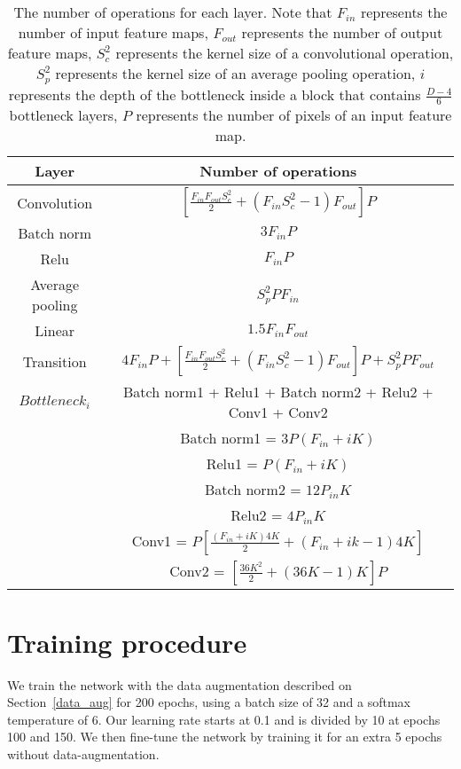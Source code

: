 \documentclass{article}
\begin{document}
\begin{table}[h]
    \centering
    \begin{tabular}{c|c}
    Layer     & Number of operations  \\
    \hline
    Convolution     &  $[\frac{F_{in}F_{out}S_c^2}{2} + (F_{in}S_c^2 -1)F_{out}]P $ \\
    \hline
    Batch norm & $3F_{in}P$ \\
    \hline
    Relu & $F_{in}P$\\
    \hline
    Average pooling & $S_p^2PF_{in} $ \\
    \hline
    Linear & $1.5F_{in}F_{out}$ \\
    \hline
    Transition & $4F_{in}P + [\frac{F_{in}F_{out}S_c^2}{2} + (F_{in}S_c^2 -1)F_{out}]P + S_p^2PF_{out}$ \\
    \hline
    $Bottleneck_i$ & Batch norm1 + Relu1 + Batch norm2 + Relu2 + Conv1 + Conv2\\
    & Batch norm1 = $3P(F_{in} + iK)$\\
    & Relu1 = $P(F_{in} + iK)$\\
    & Batch norm2 = $12P_{in}K$\\
    & Relu2 = $4P_{in}K$\\
    & Conv1 = $P[\frac{(F_{in} + iK)4K}{2} + (F_{in} + ik -1)4K]$\\
    & Conv2 = $[\frac{36K^2}{2} + (36K-1)K]P$\\
    \hline
    
    \hline
    
    \hline
    \end{tabular}
    \caption{The number of operations for each layer. Note that $F_{in}$ represents the number of input feature maps, $F_{out}$ represents the number of output feature maps, $S_c^2$ represents the kernel size of a convolutional operation, $S_p^2$ represents the kernel size of an average pooling operation, $i$ represents the depth of the bottleneck inside a block that contains $\frac{D-4}{6}$ bottleneck layers, $P$ represents the number of pixels of an input feature map.}
    \label{table:Flops}
\end{table}

\section{Training procedure}

We train the network with the data augmentation described on Section~\ref{data_aug} for 200 epochs, using a batch size of 32 and a softmax temperature of 6. Our learning rate starts at 0.1 and is divided by 10 at epochs 100 and 150. We then fine-tune the network by training it for an extra 5 epochs without data-augmentation. 

\newpage


\end{document}

